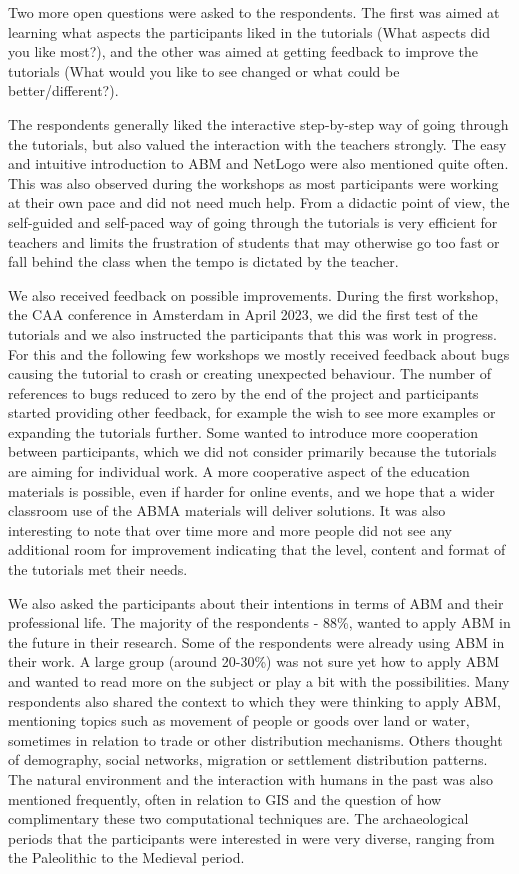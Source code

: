 \documentclass[
]{article}
\begin{document}
Two more open questions were asked to the respondents. The first was aimed at learning what aspects the participants liked in the tutorials (What aspects did you like most?), and the other was aimed at getting feedback to improve the tutorials (What would you like to see changed or what could be better/different?).

The respondents generally liked the interactive step-by-step way of going through the tutorials, but also valued the interaction with the teachers strongly. The easy and intuitive introduction to ABM and NetLogo were also mentioned quite often. This was also observed during the workshops as most participants were working at their own pace and did not need much help. From a didactic point of view, the self-guided and self-paced way of going through the tutorials is very efficient for teachers and limits the frustration of students that may otherwise go too fast or fall behind the class when the tempo is dictated by the teacher.

We also received feedback on possible improvements. During the first workshop, the CAA conference in Amsterdam in April 2023, we did the first test of the tutorials and we also instructed the participants that this was work in progress. For this and the following few workshops we mostly received feedback about bugs causing the tutorial to crash or creating unexpected behaviour. The number of references to bugs reduced to zero by the end of the project and participants started providing other feedback, for example the wish to see more examples or expanding the tutorials further. Some wanted to introduce more cooperation between participants, which we did not consider primarily because the tutorials are aiming for individual work. A more cooperative aspect of the education materials is possible, even if harder for online events, and we hope that a wider classroom use of the ABMA materials will deliver solutions. It was also interesting to note that over time more and more people did not see any additional room for improvement indicating that the level, content and format of the tutorials met their needs.

We also asked the participants about their intentions in terms of ABM and their professional life. The majority of the respondents - 88\%, wanted to apply ABM in the future in their research. Some of the respondents were already using ABM in their work. A large group (around 20-30\%) was not sure yet how to apply ABM and wanted to read more on the subject or play a bit with the possibilities. Many respondents also shared the context to which they were thinking to apply ABM, mentioning topics such as movement of people or goods over land or water, sometimes in relation to trade or other distribution mechanisms. Others thought of demography, social networks, migration or settlement distribution patterns. The natural environment and the interaction with humans in the past was also mentioned frequently, often in relation to GIS and the question of how complimentary these two computational techniques are. The archaeological periods that the participants were interested in were very diverse, ranging from the Paleolithic to the Medieval period.
\end{document}
